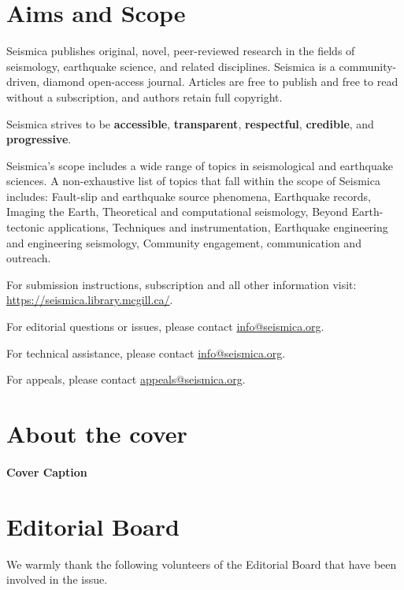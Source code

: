 \documentclass[]{seismica_cover}
\begin{document}
	\makeseistitle{
}

\section*{Aims and Scope}
Seismica publishes original, novel, peer-reviewed research in the fields of seismology, earthquake science, and related disciplines. Seismica is a community-driven, diamond open-access journal. Articles are free to publish and free to read without a subscription, and authors retain full copyright.

Seismica strives to be \textbf{accessible}, \textbf{transparent}, \textbf{respectful}, \textbf{credible}, and \textbf{progressive}.

\vspace{.3cm}
Seismica's scope includes a wide range of topics in seismological and earthquake sciences. A non-exhaustive list of topics that fall within the scope of Seismica includes: Fault-slip and earthquake source phenomena, Earthquake records, Imaging the Earth, Theoretical and computational seismology, Beyond Earth-tectonic applications, Techniques and instrumentation, Earthquake engineering and engineering seismology, Community engagement, communication and outreach.

\vspace{.3cm}
\noindent For submission instructions, subscription and all other information visit: \href{https://seismica.library.mcgill.ca/}{https://seismica.library.mcgill.ca/}.

\noindent For editorial questions or issues, please contact  \href{info@seismica.org}{info@seismica.org}.

\noindent For technical assistance, please contact \href{info@seismica.org}{info@seismica.org}.

\noindent For appeals, please contact \href{appeals@seismica.org}{appeals@seismica.org}.

\section*{About the cover}
\paragraph{Cover Caption}


\vfill\eject
\section*{Editorial Board}
We warmly thank the following volunteers of the Editorial Board that have been involved in the issue.
\end{document}
